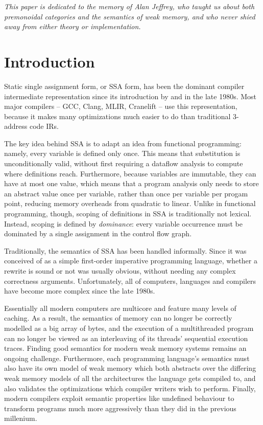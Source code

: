 \documentclass[acmsmall,screen,review]{acmart}
\begin{document}
\maketitle

\emph{This paper is dedicated to the memory of Alan Jeffrey, who
  taught us about both premonoidal categories and the semantics of weak memory, and
who never shied away from either theory or implementation.}

\section{Introduction}

Static single assignment form, or SSA form, has been the dominant compiler intermediate
representation since its introduction by \citet{alpern-ssa-original-88} and \citet{rosen-gvn-1988}
in the late 1980s. Most major compilers -- GCC, Clang, MLIR, Cranelift -- use this representation,
because it makes many optimizations much easier to do than traditional 3-address code IRs.

The key idea behind SSA is to adapt an idea from functional programming: namely, every variable is
defined only once. This means that substitution is unconditionally valid, without first requiring a
dataflow analysis to compute where definitions reach. Furthermore, because variables are immutable,
they can have at most one value, which means that a program analysis only needs to store an abstract
value once per variable, rather than once per variable per progam point, reducing memory overheads
from quadratic to linear. Unlike in functional programming, though,
scoping of definitions in SSA is traditionally not lexical. Instead, scoping is defined by
\emph{dominance}: every variable occurrence must be dominated by a single assignment in the control
flow graph.

Traditionally, the semantics of SSA has been handled informally. Since it was conceived of as a
simple first-order imperative programming language, whether a rewrite is sound or not
was usually obvious, without needing any complex correctness arguments. Unfortunately, all of 
computers, languages and compilers have become more complex since the late 1980s. 

Essentially all modern computers are multicore and feature many levels of caching. As a result,
the semantics of memory can no longer be correctly modelled as a big array of bytes, and the
execution of a multithreaded program can no longer be viewed as an interleaving of its threads'
sequential execution traces. Finding good semantics for modern weak memory systems remains an
ongoing challenge. Furthermore, each programming language's semantics must also have its own model
of weak memory which both abstracts over the differing weak memory models of all the architectures
the language gets compiled to, and also validates the optimizations which compiler writers
wish to perform. Finally, modern compilers exploit semantic properties like undefined behaviour to
transform programs much more aggressively than they did in the previous millenium. 
\end{document}
